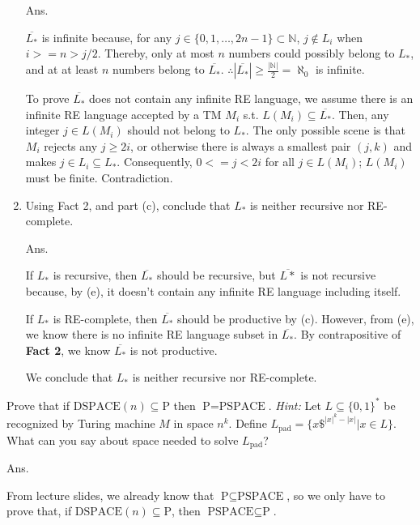\documentclass[11pt]{homework}
\newcommand{\Nat}{\ensuremath{\mathbb{N}}}
\renewcommand{\P}{\ensuremath{\text{P}}}
\newcommand{\PSPACE}{\ensuremath{\text{PSPACE}}}
\newcommand{\DSPACE}{\ensuremath{\text{DSPACE}}}
\begin{document}
\begin{enumerate}[label=(\alph*), resume]
Ans.

\(\overline{L_*}\) is infinite because, for any \(j \in \{0, 1, \dots, 2n-1\} \subset \Nat\), \(j \not\in L_i\) when \(i >= n > j/2\).
Thereby, only at most \(n\) numbers could possibly belong to \(L_*\),
and at at least \(n\) numbers belong to \(\overline{L_*}\).
\(\therefore |\overline{L_*}| \geq \frac{|\Nat|}{2} = \aleph_0\) is infinite.
 
To prove \(\overline{L_*}\) does not contain any infinite RE language,
we assume there is an infinite RE language accepted by a TM \(M_i\) s.t. \(L(M_i) \subseteq \overline{L_*}\).
Then, any integer \(j \in L(M_i)\) should not belong to \(L_*\).
The only possible scene is that \(M_i\) rejects any \(j \geq 2i\),
or otherwise there is always a smallest pair \((j, k)\) and makes \(j \in  L_i \subseteq L_*\).
Consequently, \(0 <= j < 2i\) for all \(j \in L(M_i)\); \(L(M_i)\) must be finite.
Contradiction.

  \item Using Fact 2, and part (c),
        conclude that \(L_*\) is neither recursive nor RE-complete.

Ans.

If \(L_*\) is recursive, then \(\overline{L_*}\) should be recursive,
but \(\overline{L*}\) is not recursive because, by (e), it doesn't contain any infinite RE language including itself.

If \(L_*\) is RE-complete, then \(\overline{L_*}\) should be productive by (c).
However, from (e), we know there is no infinite RE language subset in \(\overline{L_*}\).
By contrapositive of \textbf{Fact 2}, we know \(\overline{L_*}\) is not productive.

We conclude that \(L_*\) is neither recursive nor RE-complete.
\end{enumerate}

\question

\newcommand{\Lpad}{\ensuremath{L_{\text{pad}}}}

Prove that if \(\DSPACE(n) \subseteq \P\)
then \(\P = \PSPACE\).
\emph{Hint:} Let \(L \subseteq \{0,1\}^* \) be recognized by Turing machine \(M\) in space \(n^k\).
Define \(\Lpad = \{x\$^{|x|^k - |x|} | x \in L\}\).
What can you say about space needed to solve \(\Lpad\)?

Ans.

From lecture slides, we already know that \(\P \subseteq \PSPACE\),
so we only have to prove that,
if \(\DSPACE(n) \subseteq \P\), then \(\PSPACE \subseteq \P\).
\end{document}
